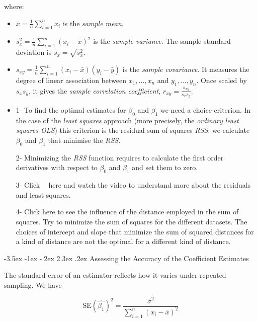 \documentclass[]{book}
\makeatletter
\providecommand{\tightlist}{%
  \setlength{\itemsep}{0pt}\setlength{\parskip}{0pt}}
\newenvironment{rmdblock}[1]
  {\begin{shaded*}
  \begin{itemize}
  \renewcommand{\labelitemi}{
    \raisebox{-.7\height}[0pt][0pt]{
      {\setkeys{Gin}{width=2em,keepaspectratio}\texttt{[image: img/icons/\#1]}}
    }
  }
  \item
  }
  {
  \end{itemize}
  \end{shaded*}
  }
\newenvironment{rmdinsight}
  {\begin{rmdblock}{insight}}
  {\end{rmdblock}}
\renewcommand\section{\@startsection {section}{1}{\z@}%
                                   {-3.5ex \@plus -1ex \@minus -.2ex}%
                                   {2.3ex \@plus.2ex}%
                                   {\normalfont\Large\bfseries\color{ForestGreen}}}
\theoremstyle{definition}
\theoremstyle{definition}
\theoremstyle{definition}
\theoremstyle{remark}
\makeatother
\begin{document}
where:

\begin{itemize}
\tightlist
\item
  \(\bar{x}=\frac{1}{n}\sum_{i=1}^nx_i\) is the \emph{sample mean}.
\item
  \(s_x^2=\frac{1}{n}\sum_{i=1}^n(x_i-\bar{x})^2\) is the \emph{sample
  variance}. The sample standard deviation is \(s_x=\sqrt{s_x^2}\).
\item
  \(s_{xy}=\frac{1}{n}\sum_{i=1}^n(x_i-\bar{x})(y_i-\bar{y})\) is the
  \emph{sample covariance}. It measures the degree of linear association
  between \(x_1,\ldots,x_n\) and \(y_1,\ldots,y_n\). Once scaled by
  \(s_xs_y\), it gives the \emph{sample correlation coefficient},
  \(r_{xy}=\frac{s_{xy}}{s_xs_y}\).
\end{itemize}

\begin{rmdinsight}
1- To find the optimal estimates for \(\beta_0\) and \(\beta_1\) we need
a choice-criterion. In the case of the \emph{least squares} approach
(more precisely, the \emph{ordinary least squares OLS}) this criterion
is the residual sum of squares \emph{RSS}: we calculate \(\beta_0\) and
\(\beta_1\) that minimise the \emph{RSS}.

2- Minimizing the \emph{RSS} function requires to calculate the first
order derivatives with respect to \(\beta_0\) and \(\beta_1\) and set
them to zero.

3- Click \textcolor{white}{[}\faVideoCamera\textcolor{white}{]} here and
watch the video to understand more about the residuals and least
squares.

4- Click here to see the influence of the distance employed in the sum
of squares. Try to minimize the sum of squares for the different
datasets. The choices of intercept and slope that minimize the sum of
squared distances for a kind of distance are not the optimal for a
different kind of distance.
\end{rmdinsight}

\section{Assessing the Accuracy of the Coefficient
Estimates}\label{assessing-the-accuracy-of-the-coefficient-estimates}

The standard error of an estimator reflects how it varies under repeated
sampling. We have

\[ \text{SE}(\hat{\beta_1})^2 =  \frac{\sigma^2}{\sum_{i=1}^{n} (x_i - \bar{x})^2} \]
\end{document}
